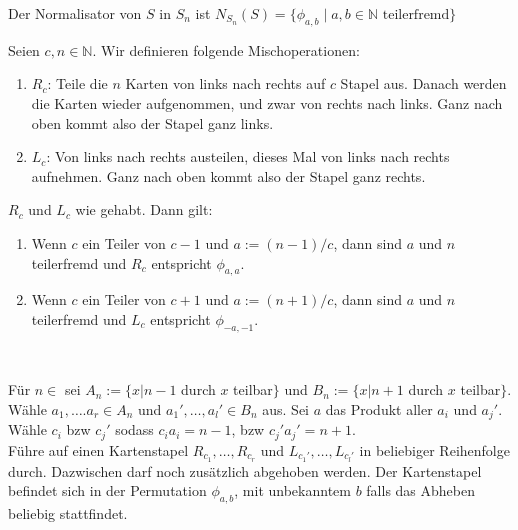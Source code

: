 \documentclass[a4paper]{article}
\newcommand{\N}{\mathbb{N}}
\begin{document}
    \begin{satz}[4.5]
            Der Normalisator von $S$ in $S_n$ ist $N_{S_n}(S) = \{\phi_{a, b}  \mid a, b \in \N \text{ teilerfremd}\}$
       
    \end{satz}
    \begin{bemerkung}[5.1] 
    Seien $c,n \in \mathbb{N}$. Wir definieren folgende Mischoperationen: 
    \begin{enumerate}
     \item $R_c$: Teile die $n$ Karten von links nach rechts auf $c$ Stapel aus. Danach werden die Karten wieder aufgenommen, und zwar von rechts nach links. Ganz nach oben kommt also der Stapel ganz links.
    \item $L_c$: Von links nach rechts austeilen, dieses Mal von links nach rechts aufnehmen.  Ganz nach oben kommt also der Stapel ganz rechts.
    \end{enumerate}
    \end{bemerkung}   
    
    \begin{satz}[5.2]
    $R_c$ und $L_c$ wie gehabt. Dann gilt:
    \begin{enumerate}
    \item Wenn $c$ ein Teiler von $c - 1$ und $a := (n - 1)/c$, dann sind $a$ und $n$ teilerfremd und $R_c$ entspricht $\phi_{a,a}$.
    \item Wenn $c$ ein Teiler von $c + 1$ und $a := (n + 1)/c$, dann sind $a$ und $n$ teilerfremd und $L_c$ entspricht $\phi_{-a,-1}$.
    \end{enumerate}
    \end{satz} \\
    
    \begin{lemma}[5.3]
    Für $n \in $  sei $A_n := \lbrace x \big\vert n-1$ durch $x$ teilbar$\rbrace$ und $B_n := \lbrace x \big\vert n+1$ durch $x$ teilbar$\rbrace$. \\
    Wähle $a_1, …. a_r \in A_n$ und $a_1', …, a_l' \in B_n$ aus. Sei $a$ das Produkt aller $a_i$ und $a_j'$. Wähle $c_i$ bzw $c_j'$ sodass $c_ia_i = n-1$, bzw $c_j'a_j' = n+1$. \\
    Führe auf einen Kartenstapel $R_{c_1}, …, R_{c_r}$ und $L_{c_1'}, …, L_{c_l'}$ in beliebiger Reihenfolge durch. Dazwischen darf noch zusätzlich abgehoben werden. Der Kartenstapel befindet sich in der Permutation $\phi_{a,b}$, mit unbekanntem $b$ falls das Abheben beliebig stattfindet.
    \end{lemma}
\end{document}

